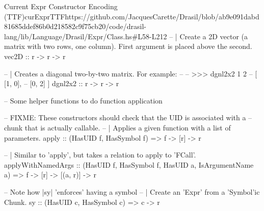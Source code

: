 \begin{haskell}{Current Expr Constructor Encoding (TTF)}{curExprTTF}{https://github.com/JacquesCarette/Drasil/blob/ab9e091dabd81685ddef86b0d218582c9f75cb20/code/drasil-lang/lib/Language/Drasil/Expr/Class.hs\#L58-L212}
  -- | Create a 2D vector (a matrix with two rows, one column). First argument is placed above the second.
  vec2D :: r -> r -> r
  
  -- | Creates a diagonal two-by-two matrix. For example:
  --
  -- >>> dgnl2x2 1 2
  -- [ [1, 0],
  --   [0, 2] ]
  dgnl2x2 :: r -> r -> r
  
  -- Some helper functions to do function application
  
  -- FIXME: These constructors should check that the UID is associated with a
  -- chunk that is actually callable.
  -- | Applies a given function with a list of parameters.
  apply :: (HasUID f, HasSymbol f) => f -> [r] -> r
  
  -- | Similar to 'apply', but takes a relation to apply to 'FCall'.
  applyWithNamedArgs :: (HasUID f, HasSymbol f, HasUID a, IsArgumentName a) => f 
    -> [r] -> [(a, r)] -> r
  
  -- Note how |sy| 'enforces' having a symbol
  -- | Create an 'Expr' from a 'Symbol'ic Chunk.
  sy :: (HasUID c, HasSymbol c) => c -> r
\end{haskell}

